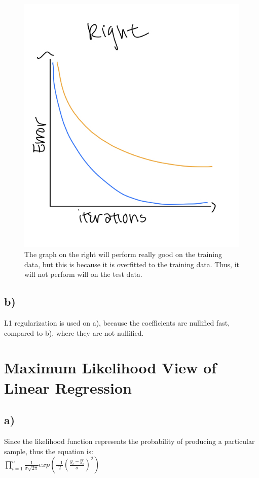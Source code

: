\documentclass[12pt, letterpaper]{article}
\begin{document}
\begin{figure}[h!]
  \includegraphics[scale=0.33]{./images/1a_right.jpg}
\caption*{The graph on the right will perform really good on the training data, but this is because it is overfitted to the training data. Thus, it will not perform will on the test data.}
\end{figure}
\clearpage

\subsection*{b)} L1 regularization is used on a), because the coefficients are nullified fast, compared to b), where they are not nullified.

\newpage
\section{Maximum Likelihood View of Linear Regression}
\subsection*{a)} Since the likelihood function represents the probability of producing a particular sample, thus the equation is:\\
$\prod_{i=1}^{n}\frac{1}{\sigma\sqrt{2\pi}}exp(\frac{-1}{2}(\frac{y_i-\hat{y_i}}{\sigma})^2)$\\
\end{document}
